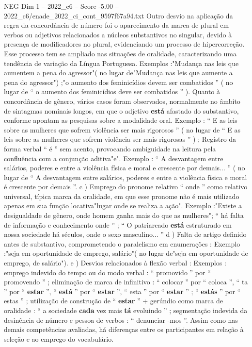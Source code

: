 \begin{textsample}{NEG Dim 1 – 2022\_c6 – Score -5.00 – 2022\_c6/enade\_2022\_ci\_cont\_9597f67a94.txt}
Outro desvio na aplicação da regra da concordância de número foi o aparecimento da marca de plural em verbos ou adjetivos relacionados a núcleos substantivos no singular, devido à presença de modificadores no plural, evidenciando um processo de hipercorreção.
Esse processo tem se ampliado nas situações de oralidade, caracterizando uma tendência de variação da Língua Portuguesa.
Exemplos :"Mudança nas leis que aumentem a pena do agressor"( no lugar de"Mudança nas leis que aumente a pena do agressor") ;"o aumento dos feminicídios devem ser combatidos ” ( no lugar de “ o aumento dos feminicídios deve ser combatidos ” ).
Quanto à concordância de gênero, vários casos foram observados, normalmente no âmbito de sintagmas nominais longos, em que o adjetivo \textbf{está} afastado do substantivo, conforme apontam as pesquisas sobre a modalidade oral.
Exemplo : “ E as leis sobre as mulheres que sofrem violência ser mais rigorosos ” ( no lugar de “ E as leis sobre as mulheres que sofrem violência ser mais rigorosas ” ) ; Registro da forma verbal “ é ” sem acento, provocando ambiguidade na leitura pela confluência com a conjunção aditiva"e".
Exemplo : “ A desvantagem entre salários, poderes e entre a violência física e moral e crescente por demais... ” ( no lugar de “ A desvantagem entre salários, poderes e entre a violência física e moral é crescente por demais ”. c ) Emprego do pronome relativo “ onde ” como relativo universal, típica marca da oralidade, em que esse pronome não é mais utilizado apenas em sua função locativa"lugar onde se realiza a ação".
Exemplo :"Existe a desigualdade de gênero, onde homem ganha mais do que as mulheres"; “ há falta de informação e conhecimento onde ” ; “ O patriarcado \textbf{está} estruturado em nossa sociedade há séculos, onde o sexo masculino... ” d ) Falta de artigo definido antes de substantivo, comprometendo o paralelismo em enumerações : Exemplo :"seja em oportunidade de emprego, salário"( no lugar de"seja em oportunidade de emprego, de salário"). e ) Desvios relacionados à flexão verbal : Exemplos : emprego indevido do tempo ou do modo verbal : “ promovido ” por “ promovendo ” ; eliminação de marca de infinitivo : “ colocar ” por “ coloca ”, “ ta ” por “ \textbf{estar} ”, “ \textbf{está} ” por “ \textbf{estar} ”, “ esta ” por “ \textbf{estar} ” ; “ \textbf{estás} ” por “ estas ” ; utilização de construção de “ \textbf{estar} ” + gerúndio como marca de oralidade : “ a sociedade \textbf{cada} vez mais \textbf{tá} evoluindo ” ; segmentação indevida da desinência de número e pessoa de verbos : “ denunciar -mos ”.
Assim como nas demais competências avaliadas, há diferenças entre os participantes em relação à seleção e ao emprego do vocabulário.

\end{textsample}
